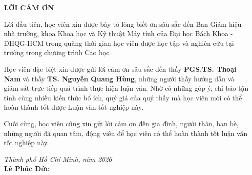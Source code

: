\newpage

\setcounter{tocdepth}{0}

\begin{center}
    \Large \textbf{LỜI CẢM ƠN}
\end{center}

Lời đầu tiên, học viên xin được bày tỏ lòng biết ơn sâu sắc đến Ban Giám hiệu nhà trường, khoa Khoa học và Kỹ thuật Máy tính của Đại học Bách Khoa - ĐHQG-HCM trong quãng thời gian học viên được học tập và nghiên cứu tại trường trong chương trình Cao học.

Học viên đặc biệt xin được gửi lời cảm ơn sâu sắc đến thầy \textbf{PGS.TS. Thoại Nam} và thầy \textbf{TS. Nguyễn Quang Hùng}, những người thầy hướng dẫn và giám sát trực tiếp quá trình thực hiện luận văn. Nhờ có những góp ý, chỉ bảo tận tình cùng nhiều kiến thức bổ ích, quý giá của quý thầy mà học viên mới có thể hoàn thành tốt được Luận văn tốt nghiệp này.

Cuối cùng, học viên cũng xin gửi lời cảm ơn đến gia đình, người thân, bạn bè, những người đã quan tâm, động viên để học viên có thể hoàn thành tốt luận văn tốt nghiệp này.

\noindent
\begin{minipage}[t]{0.45\textwidth}
\end{minipage}
\hfill
\begin{minipage}[t]{0.5\textwidth}
\centering
\fontsize{13pt}{15pt}\selectfont
\textit{Thành phố Hồ Chí Minh, năm 2026}\\
\textbf{Lê Phúc Đức}
\end{minipage}
